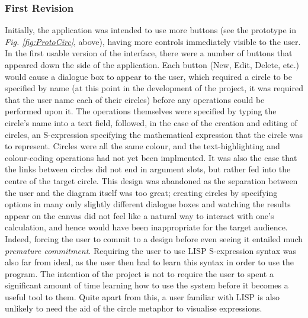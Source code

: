 \documentclass[12pt,twoside,notitlepage,xetex]{report}
\begin{document}
\subsubsection{First Revision}
Initially, the application was intended to use more buttons (see
the prototype in \emph{Fig. \ref{fig:ProtoCirc}}, above), having more controls immediately
visible to the user.  In the first usable version of the interface, there were
a number of buttons that appeared down the side of the application.  Each
button ({\sfapp New}, {\sfapp Edit}, {\sfapp Delete}, etc.) would cause a
dialogue box to appear to the user, which required a circle to be specified by
name (at this point in the development of the project, it was required that the
user name each of their circles) before any operations could be performed upon
it.  The operations themselves were specified by typing the circle's name into a text field, followed, in the case of the creation and editing of circles, an S-expression specifying the mathematical expression that the circle was to represent.  Circles were all the same colour, and the text-highlighting and colour-coding operations had not yet been implmented.  It was also the case that the links between circles did not end in argument slots, but rather fed into the centre of the target circle.  This design was abandoned as the separation between the user and the diagram itself was too great; creating circles by specifying options in many only slightly different dialogue boxes and watching the results appear on the canvas did not feel like a natural way to interact with one's calculation, and hence would have been inappropriate for the target audience.  Indeed, forcing the user to commit to a design before even seeing it entailed much \emph{premature commitment}.  Requiring the user to use LISP S-expression syntax was also far from ideal, as the user then had to learn this syntax in order to use the program.  The intention of the project is not to require the user to spent a significant amount of time learning how to use the system before it becomes a useful tool to them.  Quite apart from this, a user familiar with LISP is also unlikely to need the aid of the circle metaphor to visualise expressions.
\end{document}
